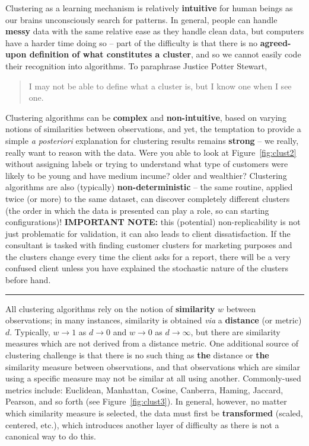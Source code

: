 \afterpage{\FloatBarrier}
Clustering as a learning mechanism is relatively \textbf{intuitive} for human beings as our brains unconsciously search for patterns. In general, people can handle \textbf{messy} data with the same relative ease as they handle clean data, but computers have a harder time doing so -- part of the difficulty is that there is no \textbf{agreed-upon definition of what constitutes a cluster}, and so we cannot easily code their recognition into algorithms. To paraphrase Justice Potter Stewart, 
\begin{quote}I may not be able to define what a cluster is, but I know one when I see one.
\end{quote}
\newpage\noindent Clustering algorithms can be \textbf{complex} and \textbf{non-intuitive}, based on varying notions of similarities between observations, and yet,  the temptation to provide a simple \textit{a posteriori} explanation for clustering results remains \textbf{strong} -- we really, really want to reason with the data. Were you able to look at Figure~\ref{fig:clust2} without assigning labels or trying to understand what type of customers were likely to be young and have medium incume? older and wealthier?  Clustering algorithms are also (typically) \textbf{non-deterministic} -- the same routine, applied twice (or more) to the same dataset, can discover completely different clusters (the order in which the data is presented can play a role, so can starting configurations)! 
\newl
\textbf{IMPORTANT NOTE:} this (potential) non-replicability is not just problematic for validation, it can also leads to client dissatisfaction. If the consultant is tasked with finding customer clusters for marketing purposes and the clusters change every time the client asks for a report, there will be a very confused client unless you have explained the stochastic nature of the clusters before hand. 
\begin{center}
    \rule{0.5\textwidth}{.4pt}
\end{center}
All clustering algorithms rely on the notion of \textbf{similarity} $w$ between observations; in many instances, similarity is obtained \textit{via} a \textbf{distance} (or metric) $d$. Typically, $w\to 1$ as $d\to 0$ and $w\to 0$ as $d\to\infty$, but there are similarity measures which are not derived from a distance metric. One additional source of clustering challenge is that there is no such thing as \textbf{the} distance  or \textbf{the} similarity measure between observations, and that observations which are similar using a specific measure may not be similar at all using another. Commonly-used metrics include: Euclidean, Manhattan, Cosine, Canberra, Haming, Jaccard, Pearson, and so forth (see Figure~\ref{fig:clust3}). In general, however, no matter which similarity measure is selected, the data must first be \textbf{transformed} (scaled, centered, etc.), which introduces another layer of difficulty as there is not a canonical way to do this. 
